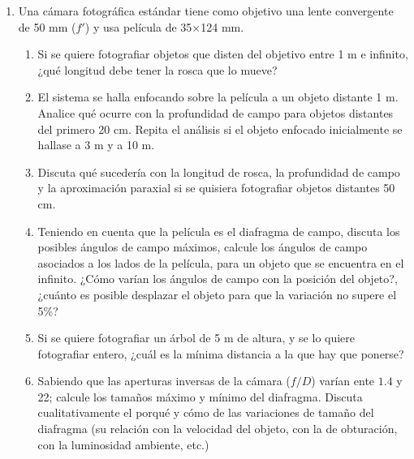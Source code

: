 \documentclass[11pt,spanish,a4paper]{article}
\begin{document}
\begin{enumerate}
\item Una cámara fotográfica estándar tiene como objetivo una lente convergente
de 50 mm ($f'$) y usa película de 35$\times$124 mm.
\begin{enumerate}
\item Si se quiere fotografiar objetos que disten del objetivo entre 1 m
e infinito, ¿qué longitud debe tener la rosca que lo mueve?
\item El sistema se halla enfocando sobre la película a un objeto distante
1 m. Analice qué ocurre con la profundidad de campo para objetos distantes
del primero 20 cm. Repita el análisis si el objeto enfocado inicialmente
se hallase a 3 m y a 10 m.
\item Discuta qué sucedería con la longitud de rosca, la profundidad de
campo y la aproximación paraxial si se quisiera fotografiar objetos
distantes 50 cm.
\item Teniendo en cuenta que la película es el diafragma de campo, discuta
los posibles ángulos de campo máximos, calcule los ángulos de campo
asociados a los lados de la película, para un objeto que se encuentra
en el infinito. ¿Cómo varían los ángulos de campo con la posición
del objeto?, ¿cuánto es posible desplazar el objeto para que la variación
no supere el 5\%?
\item Si se quiere fotografiar un árbol de 5 m de altura, y se lo quiere
fotografiar entero, ¿cuál es la mínima distancia a la que hay que
ponerse?
\item Sabiendo que las aperturas inversas de la cámara ($f/D$) varían ente
$1.4$ y 22; calcule los tamaños máximo y mínimo del diafragma. Discuta
cualitativamente el porqué y cómo de las variaciones de tamaño del
diafragma (su relación con la velocidad del objeto, con la de obturación,
con la luminosidad ambiente, etc.)\end{enumerate}
\end{enumerate}
\end{document}
